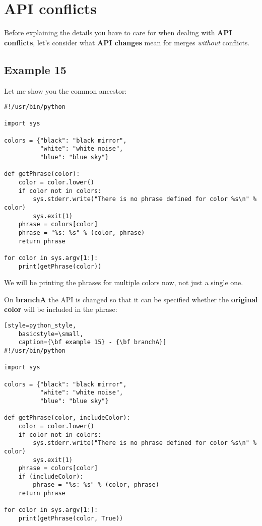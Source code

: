 
\section{API conflicts}

Before explaining the details you have to care for when dealing with {\bf API conflicts}, let's consider what {\bf API changes} mean for
merges {\it without} conflicts.

\subsection{Example 15}
\label{example_15}

Let me show you the common ancestor:
\begin{lstlisting}[style=python_style,
	basicstyle=\small,
	caption={\bf example 15} - common ancestor]
#!/usr/bin/python

import sys

colors = {"black": "black mirror",
          "white": "white noise",
          "blue": "blue sky"}

def getPhrase(color):
    color = color.lower()
    if color not in colors:
        sys.stderr.write("There is no phrase defined for color %s\n" % color)
        sys.exit(1)
    phrase = colors[color]
    phrase = "%s: %s" % (color, phrase)
    return phrase

for color in sys.argv[1:]:
    print(getPhrase(color))
\end{lstlisting}

We will be printing the phrases for multiple colors now, not just a single one.

On {\bf branchA} the API is changed so that it can be specified whether the {\bf original color} will be included in the phrase:
\begin{lstlisting}[style=python_style,
	basicstyle=\small,
	caption={\bf example 15} - {\bf branchA}]
#!/usr/bin/python

import sys

colors = {"black": "black mirror",
          "white": "white noise",
          "blue": "blue sky"}

def getPhrase(color, includeColor):
    color = color.lower()
    if color not in colors:
        sys.stderr.write("There is no phrase defined for color %s\n" % color)
        sys.exit(1)
    phrase = colors[color]
    if (includeColor):
        phrase = "%s: %s" % (color, phrase)
    return phrase

for color in sys.argv[1:]:
    print(getPhrase(color, True))
\end{lstlisting}

